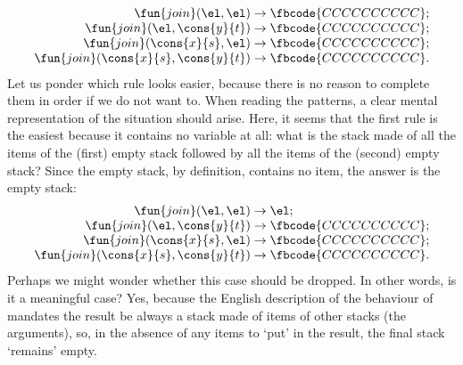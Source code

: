 \begin{equation*}
\begin{array}{r@{\;}l@{\;}l}
\fun{join}(\el,\el) & \rightarrow & \fbcode{CCCCCCCCCC};\\
\fun{join}(\el,\cons{y}{t}) & \rightarrow & \fbcode{CCCCCCCCCC};\\
\fun{join}(\cons{x}{s},\el) & \rightarrow & \fbcode{CCCCCCCCCC};\\
\fun{join}(\cons{x}{s},\cons{y}{t}) & \rightarrow & \fbcode{CCCCCCCCCC}.
\end{array}
\end{equation*}
Let us ponder which rule looks easier, because there is no reason to
complete them in order if we do not want to. When reading the
patterns, a clear mental representation of the situation should
arise. Here, it seems that the first rule is the easiest because it
contains no variable at all: what is the stack made of all the items
of the (first) empty stack followed by all the items of the (second)
empty stack? Since the empty stack, by definition, contains no item,
the answer is the empty stack:
\begin{equation*}
\begin{array}{r@{\;}l@{\;}l}
\fun{join}(\el,\el) & \rightarrow & \el;\\
\fun{join}(\el,\cons{y}{t}) & \rightarrow & \fbcode{CCCCCCCCCC};\\
\fun{join}(\cons{x}{s},\el) & \rightarrow & \fbcode{CCCCCCCCCC};\\
\fun{join}(\cons{x}{s},\cons{y}{t}) & \rightarrow & \fbcode{CCCCCCCCCC}.
\end{array}
\end{equation*}
Perhaps we might wonder whether this case should be dropped. In other
words, is it a meaningful case? Yes, because the English description
of the behaviour of  mandates the result be always a stack
made of items of other stacks (the arguments), so, in the absence of
any items to `put' in the result, the final stack `remains' empty.

